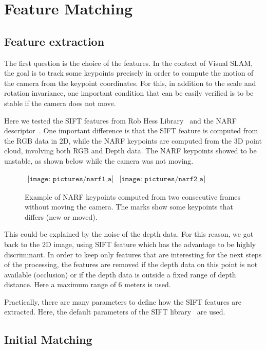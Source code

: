 \chapter{Feature Matching}
\label{chap:features}

\section{Feature extraction}

The first question is the choice of the features. In the context of Visual SLAM, the goal is to track some keypoints precisely in order to compute the motion of the camera from the keypoint coordinates. For this, in addition to the scale and rotation invariance, one important condition that can be easily verified is to be stable if the camera does not move. 

Here we tested the SIFT features from Rob Hess Library~\cite{hess_sift} and the NARF descriptor~\cite{steder10irosws}. One important difference is that the SIFT feature is computed from the RGB data in 2D, while the NARF keypoints are computed from the 3D point cloud, involving both RGB and Depth data.
The NARF keypoints showed to be unstable, as shown below while the camera was not moving.

\begin{figure}[h!]
\centering$
\begin{array}{cc}
\texttt{[image: pictures/narf1\_a]} &
\texttt{[image: pictures/narf2\_a]}
\end{array}$
\caption{Example of NARF keypoints computed from two consecutive frames without moving the camera. The marks show some keypoints that differs (new or moved).}
\end{figure}

This could be explained by the noise of the depth data. For this reason, we got back to the 2D image, using SIFT feature which has the advantage to be highly discriminant. In order to keep only features that are interesting for the next steps of the processing, the features are removed if the depth data on this point is not available (occlusion) or if the depth data is outside a fixed range of depth distance. Here a maximum range of 6 meters is used.

Practically, there are many parameters to define how the SIFT features are extracted. Here, the default parameters of the SIFT library~\cite{hess_sift} are used.

\section{Initial Matching}

